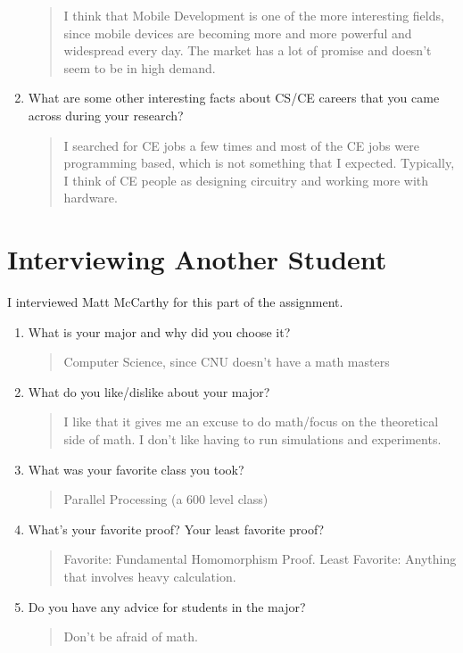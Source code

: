 \documentclass{hw}
\begin{document}
\begin{enumerate}
\begin{quote}
I think that Mobile Development is one of the more interesting fields, since mobile devices are becoming more and more powerful and widespread every day. The market has a lot of promise and doesn't seem to be in high demand.
\end{quote}
\item What are some other interesting facts about CS/CE careers that you came across during your research?
\begin{quote}
I searched for CE jobs a few times and most of the CE jobs were programming based, which is not something that I expected. Typically, I think of CE people as designing circuitry and working more with hardware.
\end{quote}
\end{enumerate}

\section*{Interviewing Another Student}

I interviewed Matt McCarthy for this part of the assignment.
\begin{enumerate}
\item What is your major and why did you choose it?
\begin{quote}
Computer Science, since CNU doesn't have a math masters
\end{quote}
\item What do you like/dislike about your major?
\begin{quote}
I like that it gives me an excuse to do math/focus on the theoretical side of math. I don't like having to run simulations and experiments.
\end{quote}
\item What was your favorite class you took?
\begin{quote}
Parallel Processing (a 600 level class)
\end{quote}
\item What's your favorite proof? Your least favorite proof?
\begin{quote}
Favorite: Fundamental Homomorphism Proof. Least Favorite: Anything that involves heavy calculation.
\end{quote}
\item Do you have any advice for students in the major?
\begin{quote}
Don't be afraid of math.
\end{quote}
\end{enumerate}
\end{document}
